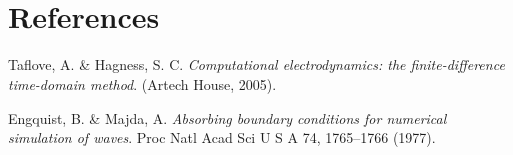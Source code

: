 \documentclass{article}
\begin{document}
    \begin{center}
    \end{center}
    { \hspace*{\fill} \\}
    
    \begin{center}
    \end{center}
    { \hspace*{\fill} \\}
    
    \section{References}\label{references}

Taflove, A. \& Hagness, S. C. \emph{Computational electrodynamics: the
finite-difference time-domain method}. (Artech House, 2005).

Engquist, B. \& Majda, A. \emph{Absorbing boundary conditions for
numerical simulation of waves}. Proc Natl Acad Sci U S A 74, 1765--1766
(1977).


    
    
    
    
\end{document}
